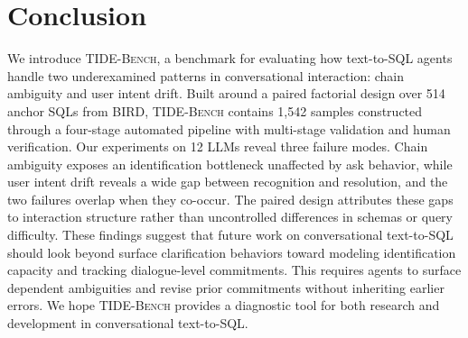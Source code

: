 \section{Conclusion}
\label{sec:conclusion}

We introduce \textsc{TIDE-Bench}, a benchmark for evaluating how text-to-SQL agents handle two underexamined  patterns in conversational interaction: chain ambiguity and user intent drift. Built around a paired factorial design over 514 anchor SQLs from BIRD, \textsc{TIDE-Bench} contains 1{,}542 samples constructed through a four-stage automated pipeline with multi-stage validation and human verification. Our experiments on 12 LLMs reveal three failure modes. Chain ambiguity exposes an identification bottleneck unaffected by ask behavior, while user intent drift reveals a wide gap between recognition and resolution, and the two failures overlap when they co-occur. The paired design attributes these gaps to interaction structure rather than uncontrolled differences in schemas or query difficulty. These findings suggest that future work on conversational text-to-SQL should look beyond surface clarification behaviors toward modeling identification capacity and tracking dialogue-level commitments. This requires agents to surface dependent ambiguities and revise prior commitments without inheriting earlier errors. We hope \textsc{TIDE-Bench} provides a diagnostic tool for both research and development in conversational text-to-SQL.